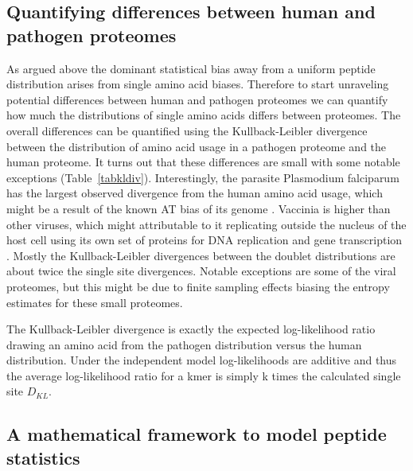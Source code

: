 \documentclass[superscriptaddress,twocolumn,pre]{revtex4}
\newcommand{\<}{\langle}
\renewcommand{\>}{\rangle}
\begin{document}
\subsection{Quantifying differences between human and pathogen proteomes}

As argued above the dominant statistical bias away from a uniform peptide distribution arises from single amino acid biases. Therefore to start unraveling potential differences between human and pathogen proteomes we can quantify how much the distributions of single amino acids differs between proteomes. The overall differences can be quantified using the Kullback-Leibler divergence between the distribution of amino acid usage in a pathogen proteome and the human proteome. It turns out that these differences are small with some notable exceptions (Table~\ref{tabkldiv}). Interestingly, the parasite Plasmodium falciparum has the largest observed divergence from the human amino acid usage, which might be a result of the known AT bias of its genome \cite{Hamilton2017}. Vaccinia is higher than other viruses, which might attributable to it replicating outside the nucleus of the host cell using its own set of proteins for DNA replication and gene transcription \cite{Tolonen2001}. Mostly the Kullback-Leibler divergences between the doublet distributions are about twice the single site divergences. Notable exceptions are some of the viral proteomes, but this might be due to finite sampling effects biasing the entropy estimates for these small proteomes.

The Kullback-Leibler divergence is exactly the expected log-likelihood ratio drawing an amino acid from the pathogen distribution versus the human distribution. Under the independent model log-likelihoods are additive and thus the average log-likelihood ratio for a kmer is simply k times the calculated single site $D_{KL}$.







\subsection{A mathematical framework to model peptide statistics} 
\end{document}
